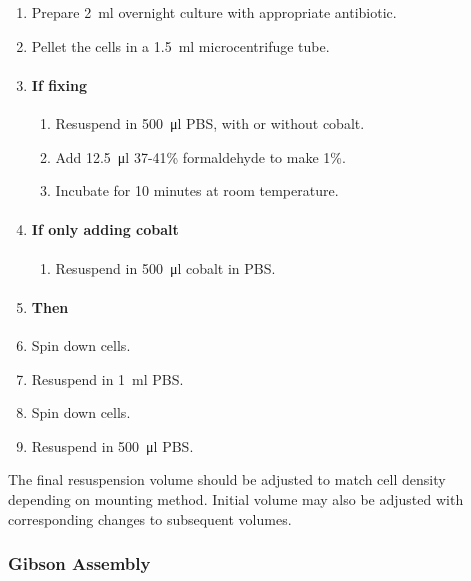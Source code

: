 \documentclass[../main.tex]{subfiles}
\begin{document}
\begin{enumerate}
\item Prepare \SI{2}{\milli\litre} overnight culture with appropriate antibiotic.
\item Pellet the cells in a \SI{1.5}{\milli\litre} microcentrifuge tube.
\item \paragraph{If fixing}
\begin{enumerate}
\item Resuspend in \SI{500}{\micro\litre} PBS, with or without cobalt.
\item Add \SI{12.5}{\micro\litre} 37-41\% formaldehyde to make 1\%.
\item Incubate for 10 minutes at room temperature.
\end{enumerate}
\item \paragraph{If only adding cobalt}
\begin{enumerate}
\item Resuspend in \SI{500}{\micro\litre} cobalt in PBS.
\end{enumerate}
\item[] \paragraph{Then}
\item Spin down cells.
\item Resuspend in \SI{1}{\milli\litre} PBS.
\item Spin down cells.
\item Resuspend in \SI{500}{\micro\litre} PBS.
\end{enumerate}

The final resuspension volume should be adjusted to match cell density depending on mounting method. Initial volume may also be adjusted with corresponding changes to subsequent volumes.

\subsubsection{Gibson Assembly}
\end{document}
